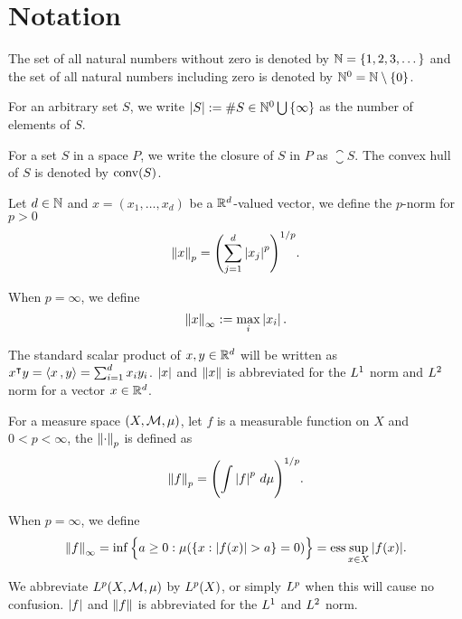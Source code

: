 \chapter*{Notation}
\label{c:Notation}


The set of all natural numbers without zero is denoted by $\mathbb{N} =
\{1,2,3,\dots\}$ and the set of all natural numbers including zero is denoted by
$\mathbb{N}^0 = \mathbb{N} \setminus \{0\}$. 

For an arbitrary set $S$, we write $\left| S \right| := \# S \in \mathbb{N}^0 \bigcup\,
\{\infty\}$ as the number of elements of $S$.

For a set $S$ in a space $P$, we write the closure of $S$ in $P$ as
$\closure{S}$. The convex hull of $S$ is denoted by $\operatorname*{conv}(S)$.

Let $d \in \mathbb{N}$ and $x = (x_1, \dots, x_d)$ be a $\mathbb{R}^d$-valued vector, we
define the $p$-norm for $p>0$
\begin{equation*}
    \left\| x \right\|_p = \Biggl( \sum_{j=1}^d \left| x_j \right|^p \Biggr)^{1/p}.
\end{equation*}

When $p = \infty$, we define 
\begin{equation*}
    \left\| x \right\|_{\infty} := \max_i \left| x_i \right|.
\end{equation*}

The standard scalar product of $x,y\in\mathbb{R}^d$ will be written as $x{}^{\intercal} y =
\left\langle x\, , y \right\rangle = \sum_{i=1}^d x_iy_i$. $\left| x \right|$ and $\left\| x \right\|$ is abbreviated for
the $L^{1}$ norm and $L^{2}$ norm for a vector $x \in \mathbb{R}^d$.

For a measure space $(X, \mathcal{M}, \mu)$, let $f$ is a measurable function on
$X$ and $0 < p < \infty$, the $\left\| \cdot \right\|_{p}$ is defined as
\begin{equation*}
    \left\| f \right\|_p = \Biggl( \int \left| f \right|^p \, d\mu \Biggr)^{1/p}.
\end{equation*}

When $p = \infty$, we define 
\begin{equation*}
    \left\| f \right\|_{\infty} = \inf\Big\{
        a \geq 0:
        \mu(\{x: \left| f(x) \right| > a \} = 0)
    \Big\} = \operatorname*{ess}{\sup_{x\in X} \left| f(x) \right|}.
\end{equation*}

We abbreviate $L^{p}(X, \mathcal{M}, \mu)$ by $L^{p}(X)$, or simply $L^{p}$ when
this will cause no confusion. $\left| f \right|$ and $\left\| f \right\|$ is abbreviated for the
$L^{1}$ and $L^{2}$ norm.

